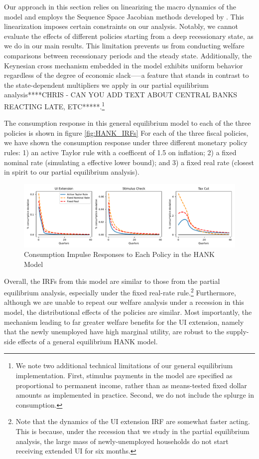 \documentclass[\econtexRoot/HAFiscal]{subfiles}
\begin{document}
Our approach in this section relies on linearizing the macro dynamics of the model and employs the Sequence Space Jacobian methods developed by \cite{Auclert2021}. This linearization imposes certain constraints on our analysis. Notably, we cannot evaluate the effects of different policies starting from a deep recessionary state, as we do in our main results. This limitation prevents us from conducting welfare comparisons between recessionary periods and the steady state. Additionally, the Keynesian cross mechanism embedded in the model exhibits uniform behavior regardless of the degree of economic slack—--a feature that stands in contrast to the state-dependent multipliers we apply in our partial equilibrium analysis****CHRIS - CAN YOU ADD TEXT ABOUT CENTRAL BANKS REACTING LATE, ETC*****.\footnote{We note two additional technical limitations of our general equilibrium implementation. First, stimulus payments in the model are specified as proportional to permanent income, rather than as means-tested fixed dollar amounts as implemented in practice. Second, we do not include the splurge in consumption.}



The consumption response in this general equilibrium model to each of the three policies is shown in figure \ref{fig:HANK_IRFs} For each of the three fiscal policies, we have shown the consumption response under three different monetary policy rules: 1) an active Taylor rule with a coefficent of 1.5 on inflation; 2) a fixed nominal rate (simulating a effective lower bound); and 3) a fixed real rate (closest in spirit to our partial equilibrium analysis).


\begin{figure}[th]
	\begin{center}
		\includegraphics[width=.9\textwidth]{../Figures/HANK_IRFs.pdf}
		\caption{Consumption Impulse Responses to Each Policy in the HANK Model}
		\notinsubfile{\label{fig:HANK_IRFs}}
	\end{center}
\end{figure}


Overall, the IRFs from this model are similar to those from the partial equilibrium analysis, especially under the fixed real-rate rule.\footnote{Note that the dynamics of the UI extension IRF are somewhat faster acting. This is because, under the recession that we study in the partial equilibrium analysis, the large mass of newly-unemployed households do not start receiving extended UI for six months. } Furthermore, although we are unable to repeat our welfare analysis under a recession in this model, the distributional effects of the policies are similar. Most importantly, the mechanism leading to far greater welfare benefits for the UI extension, namely that the newly unemployed have high marginal utility, are robust to the supply-side effects of a general equilibrium HANK model.
\end{document}
